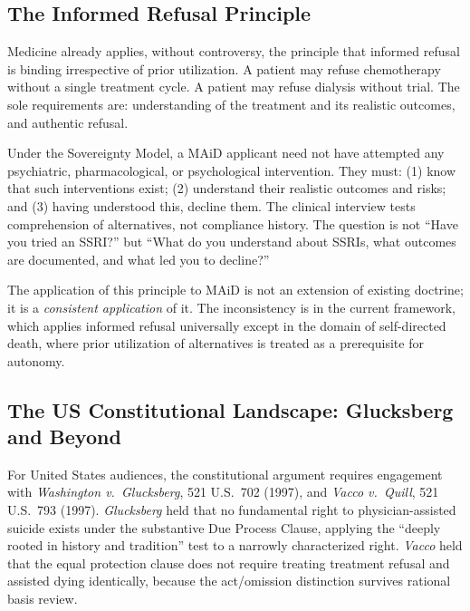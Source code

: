 \documentclass[11pt, letterpaper]{article}
\begin{document}
\subsection{The Informed Refusal Principle}

Medicine already applies, without controversy, the principle that informed refusal is
binding irrespective of prior utilization. A patient may refuse chemotherapy without
a single treatment cycle. A patient may refuse dialysis without trial. The sole
requirements are: understanding of the treatment and its realistic outcomes, and
authentic refusal.

\begin{policybox}[title={\sffamily\bfseries\small\color{C@accent}
  The Informed Refusal Standard Applied to MAiD}]
Under the Sovereignty Model, a MAiD applicant need not have attempted any psychiatric,
pharmacological, or psychological intervention. They must: (1) know that such
interventions exist; (2) understand their realistic outcomes and risks; and
(3) having understood this, decline them. The clinical interview tests comprehension
of alternatives, not compliance history. The question is not ``Have you tried an
SSRI?'' but ``What do you understand about SSRIs, what outcomes are documented, and
what led you to decline?''
\end{policybox}

The application of this principle to MAiD is not an extension of existing doctrine;
it is a \textit{consistent application} of it. The inconsistency is in the current
framework, which applies informed refusal universally except in the domain of
self-directed death, where prior utilization of alternatives is treated as a
prerequisite for autonomy.

\subsection{The US Constitutional Landscape: Glucksberg and Beyond}

For United States audiences, the constitutional argument requires engagement with
\textit{Washington v.\ Glucksberg}, 521 U.S.\ 702 (1997), and \textit{Vacco v.\ Quill},
521 U.S.\ 793 (1997). \textit{Glucksberg} held that no fundamental right to
physician-assisted suicide exists under the substantive Due Process Clause, applying
the ``deeply rooted in history and tradition'' test to a narrowly characterized right.
\textit{Vacco} held that the equal protection clause does not require treating treatment
refusal and assisted dying identically, because the act/omission distinction survives
rational basis review.
\end{document}
